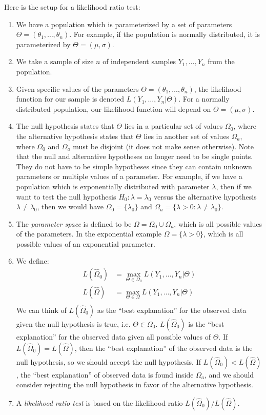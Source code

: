 \documentclass[12pt]{article}
\theoremstyle{definition}
\theoremstyle{remark}
\begin{document}
Here is the setup for a likelihood ratio test:
\begin{enumerate}
\item We have a population which is parameterized by a set of parameters $\Theta = (\theta_1, \dots, \theta_n)$. For example, if the population is normally distributed, it is parameterized by $\Theta = (\mu, \sigma)$.
\item We take a sample of size $n$ of independent samples $Y_1, \dots, Y_n$ from the population.
\item Given specific values of the parameters $\Theta = (\theta_1, \dots, \theta_n)$, the likelihood function for our sample is denoted $L(Y_1, \dots, Y_n|\Theta)$. For a normally distributed population, our likelihood function will depend on $\Theta = (\mu, \sigma)$.
\item The null hypothesis states that $\Theta$ lies in a particular set of values $\Omega_0$, where the alternative hypothesis states that $\Theta$ lies in another set of values $\Omega_a$, where $\Omega_0$ and $\Omega_a$ must be disjoint (it does not make sense otherwise). Note that the null and alternative hypotheses no longer need to be single points. They do not have to be simple hypotheses since they can contain unknown parameters or multiple values of a parameter. For example, if we have a population which is exponentially distributed with parameter $\lambda$, then if we want to test the null hypothesis $H_0: \lambda = \lambda_0$ versus the alternative hypothesis $\lambda \neq \lambda_0$, then we would have $\Omega_0 = \{ \lambda_0 \}$ and $\Omega_a = \{ \lambda > 0 : \lambda \neq \lambda_0 \}$.
\item The \emph{parameter space} is defined to be $\Omega = \Omega_0 \cup \Omega_a$, which is all possible values of the parameters. In the exponential example $\Omega = \{ \lambda > 0 \}$, which is all possible values of an exponential parameter.
\item We define:
\begin{align*}
L(\hat{\Omega}_0) &= \max_{\Theta \in \Omega_0} L(Y_1, \dots, Y_n|\Theta) \\
L(\hat{\Omega}) &= \max_{\Theta \in \Omega} L(Y_1, \dots, Y_n|\Theta) \\
\end{align*}
We can think of $L(\hat{\Omega}_0)$ as the ``best explanation'' for the observed data given the null hypothesis is true, i.e. $\Theta \in \Omega_0$. $L(\hat{\Omega}_0)$ is the ``best explanation'' for the observed data given all possible values of $\Theta$. If $L(\hat{\Omega}_0) = L(\hat{\Omega})$, then the ``best explanation'' of the observed data is the null hypothesis, so we should accept the null hypothesis. If $L(\hat{\Omega}_0) < L(\hat{\Omega})$, the ``best explanation'' of observed data is found inside $\Omega_a$, and we should consider rejecting the null hypothesis in favor of the alternative hypothesis.
\item A \emph{likelihood ratio test} is based on the likelihood ratio $L(\hat{\Omega}_0)/L(\hat{\Omega})$.
\end{enumerate}
\end{document}

